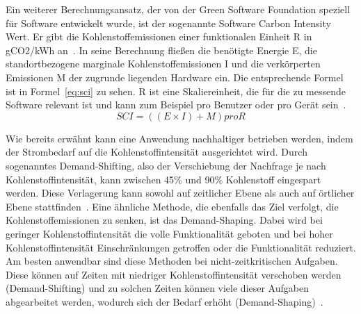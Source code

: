 Ein weiterer Berechnungsansatz, der von der Green Software Foundation speziell für Software entwickelt wurde, ist der sogenannte Software Carbon Intensity Wert.
Er gibt die Kohlenstoffemissionen einer funktionalen Einheit R in gCO2/kWh an~\cite{GreenSoftwareFoundation.2022}.
In seine Berechnung fließen die benötigte Energie E, die standortbezogene marginale Kohlenstoffemissionen I und die verkörperten Emissionen M der zugrunde liegenden Hardware ein.
Die entsprechende Formel ist in Formel~\ref{eq:sci} zu sehen.
R ist eine Skaliereinheit, die für die zu messende Software relevant ist und kann zum Beispiel pro Benutzer oder pro Gerät sein~\cite{Buchanan.2023}.
\begin{equation}
 \label{eq:sci}
 SCI = ((E \times I) + M) pro R
\end{equation}

Wie bereits erwähnt kann eine Anwendung nachhaltiger betrieben werden, indem der Strombedarf auf die Kohlenstoffintensität ausgerichtet wird.
Durch sogenanntes Demand-Shifting, also der Verschiebung der Nachfrage je nach Kohlenstoffintensität, kann zwischen 45\% und 90\% Kohlenstoff eingespart werden.
Diese Verlagerung kann sowohl auf zeitlicher Ebene als auch auf örtlicher Ebene stattfinden~\cite{GreenSoftwareFoundation.2022}.
Eine ähnliche Methode, die ebenfalls das Ziel verfolgt, die Kohlenstoffemissionen zu senken, ist das Demand-Shaping.
Dabei wird bei geringer Kohlenstoffintensität die volle Funktionalität geboten und bei hoher Kohlenstoffintensität Einschränkungen getroffen oder die Funktionalität reduziert.
Am besten anwendbar sind diese Methoden bei nicht-zeitkritischen Aufgaben.
Diese können auf Zeiten mit niedriger Kohlenstoffintensität verschoben werden (Demand-Shifting) und zu solchen Zeiten können viele dieser Aufgaben abgearbeitet werden, wodurch sich der Bedarf erhöht (Demand-Shaping)~\cite{Currie.2024}.

